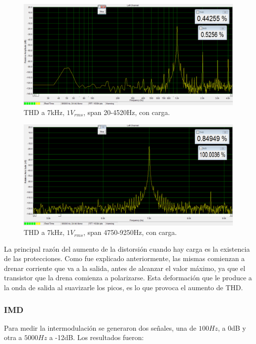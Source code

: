 \begin{figure}[H]
\centering
\includegraphics[width=\textwidth]{img/Distorsion/THD_1k_1V_carga_span_20_4520.png}
\caption{THD a 7kHz, $1V_{rms}$, span 20-4520Hz, con carga.}
\label{THD7} 
\end{figure}

\begin{figure}[H]
\centering
\includegraphics[width=\textwidth]{img/Distorsion/THD_7k_1V_carga_span_4750_9250.png}
\caption{THD a 7kHz, $1V_{rms}$, span 4750-9250Hz, con carga.}
\label{THD8} 
\end{figure}

La principal razón del aumento de la distorsión cuando hay carga es la existencia de las protecciones. Como fue explicado anteriormente, las mismas comienzan a drenar corriente que va a la salida, antes de alcanzar el valor máximo, ya que el transistor que la drena comienza a polarizarse. Esta deformación que le produce a la onda de salida al suavizarle los picos, es lo que provoca el aumento de THD.

\subsubsection*{IMD}

Para medir la intermodulación se generaron dos señales, una de $100Hz$, a 0dB y otra a $5000Hz$ a -12dB. Los resultados fueron:


